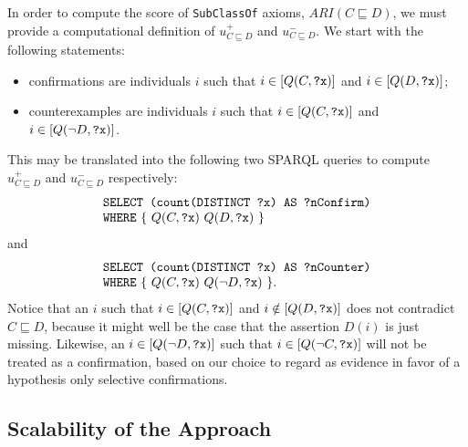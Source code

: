 \documentclass{sig-alternate}
\begin{document}
In order to compute the score of \texttt{SubClassOf} axioms, $ARI(C \sqsubseteq D)$, we must provide a computational definition of $u^+_{C \sqsubseteq D}$ and $u^-_{C \sqsubseteq D}$. We start with the following statements:
\begin{itemize}
\item confirmations are individuals $i$ such that
  $i \in [Q(C, \mbox{\tt ?x})]$ and $i \in [Q(D, \mbox{\tt ?x})]$;
\item counterexamples are individuals $i$ such that
  $i \in [Q(C, \mbox{\tt ?x})]$ and $i \in [Q(\neg D, \mbox{\tt ?x})]$.
\end{itemize}
This may be translated into the following two SPARQL queries to compute $u^+_{C \sqsubseteq D}$ and $u^-_{C \sqsubseteq D}$ respectively:
\begin{equation}\label{eq:query-conf}
  \begin{minipage}[c]{5in}
    \begin{tabbing}
      \quad\=\quad\=\quad\=\kill
      \texttt{SELECT (count(DISTINCT ?x) AS ?nConfirm)}\\
      \texttt{WHERE} \{ $Q(C, \mbox{\tt ?x})$ $Q(D, \mbox{\tt ?x})$ \}
    \end{tabbing}
  \end{minipage}
\end{equation}
and
\begin{equation}\label{eq:query-expt}
  \begin{minipage}[c]{5in}
    \begin{tabbing}
      \quad\=\quad\=\quad\=\kill
      \texttt{SELECT (count(DISTINCT ?x) AS ?nCounter)}\\
      \texttt{WHERE} \{ $Q(C, \mbox{\tt ?x})$ $Q(\neg D, \mbox{\tt ?x})$ \}.
    \end{tabbing}
  \end{minipage}
\end{equation}
Notice that an $i$ such that $i \in [Q(C, \mbox{\tt ?x})]$ and $i \notin [Q(D, \mbox{\tt ?x})]$
does not contradict $C \sqsubseteq D$, because it might well be the case
that the assertion $D(i)$ is just missing.
Likewise, an $i \in [Q(\neg D, \mbox{\tt ?x})]$ such that $i \in [Q(\neg C, \mbox{\tt ?x})]$
will not be treated as a confirmation, based on our choice to regard as
evidence in favor of a hypothesis only selective confirmations.

\subsection{Scalability of the Approach}
\label{results-no-timeout}
\end{document}
